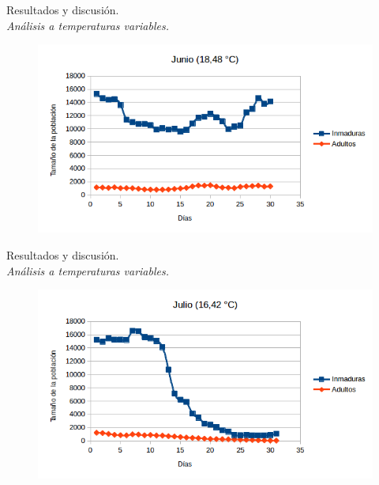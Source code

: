 \begin{frame}[t]{Resultados y discusión.\\\textit{Análisis a temperaturas variables.}}
    \begin{figure}
    \includegraphics[width=\textwidth]{./graphics/py-2010-junio.png}
    \end{figure}
\end{frame}

\begin{frame}[t]{Resultados y discusión.\\\textit{Análisis a temperaturas variables.}}
    \begin{figure}
    \includegraphics[width=\textwidth]{./graphics/py-2010-julio.png}
    \end{figure}
\end{frame}

